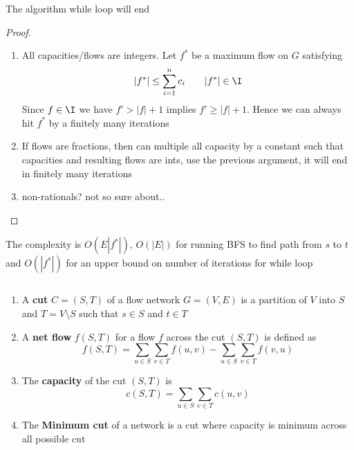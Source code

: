 \documentclass[11pt]{article}
\begin{document}
\begin{solution}
  \begin{proposition*}
    The algorithm while loop will end
    \begin{proof}
      $ $\\
      \begin{enumerate}
        \item All capacities/flows are integers. Let $f^*$ be a maximum flow on $G$ satisfying
        \[
          |f^*| \leq \sum_{i=1}^n c_i \quad \quad |f^*| \in \I
        \]
        Since $f \in \I$ we have  $f' > |f| + 1$ implies $f' \geq |f| + 1$. Hence we can always hit $f^*$ by a finitely many iterations
        \item If flows are fractions, then can multiple all capacity by a constant such that capacities and resulting flows are ints, use the previous argument, it will end in finitely many iterations
        \item non-rationals? not so sure about..
      \end{enumerate}
    \end{proof}
  \end{proposition*}

  The complexity is $O(E|f^*|)$, $O(|E|)$ for running BFS to find path from $s$ to $t$ and $O(|f^*|)$ for an upper bound on number of iterations for while loop
\end{solution}




\begin{defn*}
  $ $\\
  \begin{enumerate}
    \item A \textbf{cut} $C = (S, T)$ of a flow network $G = (V, E)$ is a partition of $V$ into $S$ and $T = V\setminus S$ such that $s\in S$ and $t\in T$
    \item   A \textbf{net flow} $f(S,T)$ for a flow $f$ across the cut $(S,T)$ is defined as
      \[
        f(S,T)= \sum_{u\in S}\sum_{v\in T} f(u,v) -  \sum_{u\in S}\sum_{v\in T} f(v,u)
      \]
    \item The \textbf{capacity} of the cut $(S,T)$ is
    \[
      c(S,T) = \sum_{u\in S}\sum_{v\in T} c(u,v)
    \]
    \item The \textbf{Minimum cut} of a network is a cut where capacity is minimum across all possible cut
  \end{enumerate}
\end{defn*}
\end{document}
